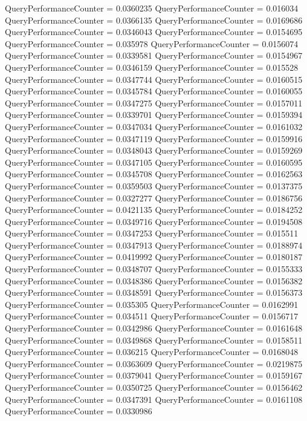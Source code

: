 \documentclass[9pt]{article}
\theoremstyle{plain}
\theoremstyle{definition}
\theoremstyle{remark}
\numberwithin{equation}{section}
\begin{document}
QueryPerformanceCounter  =  0.0360235
QueryPerformanceCounter  =  0.016034
QueryPerformanceCounter  =  0.0366135
QueryPerformanceCounter  =  0.0169686
QueryPerformanceCounter  =  0.0346043
QueryPerformanceCounter  =  0.0154695
QueryPerformanceCounter  =  0.035978
QueryPerformanceCounter  =  0.0156074
QueryPerformanceCounter  =  0.0339581
QueryPerformanceCounter  =  0.0154967
QueryPerformanceCounter  =  0.0346159
QueryPerformanceCounter  =  0.015528
QueryPerformanceCounter  =  0.0347744
QueryPerformanceCounter  =  0.0160515
QueryPerformanceCounter  =  0.0345784
QueryPerformanceCounter  =  0.0160055
QueryPerformanceCounter  =  0.0347275
QueryPerformanceCounter  =  0.0157011
QueryPerformanceCounter  =  0.0339701
QueryPerformanceCounter  =  0.0159394
QueryPerformanceCounter  =  0.0347034
QueryPerformanceCounter  =  0.0161032
QueryPerformanceCounter  =  0.0347119
QueryPerformanceCounter  =  0.0159916
QueryPerformanceCounter  =  0.0348043
QueryPerformanceCounter  =  0.0159269
QueryPerformanceCounter  =  0.0347105
QueryPerformanceCounter  =  0.0160595
QueryPerformanceCounter  =  0.0345708
QueryPerformanceCounter  =  0.0162563
QueryPerformanceCounter  =  0.0359503
QueryPerformanceCounter  =  0.0137375
QueryPerformanceCounter  =  0.0327277
QueryPerformanceCounter  =  0.0186756
QueryPerformanceCounter  =  0.0421135
QueryPerformanceCounter  =  0.0184252
QueryPerformanceCounter  =  0.0349716
QueryPerformanceCounter  =  0.0194508
QueryPerformanceCounter  =  0.0347253
QueryPerformanceCounter  =  0.015511
QueryPerformanceCounter  =  0.0347913
QueryPerformanceCounter  =  0.0188974
QueryPerformanceCounter  =  0.0419992
QueryPerformanceCounter  =  0.0180187
QueryPerformanceCounter  =  0.0348707
QueryPerformanceCounter  =  0.0155333
QueryPerformanceCounter  =  0.0348386
QueryPerformanceCounter  =  0.0156382
QueryPerformanceCounter  =  0.0348591
QueryPerformanceCounter  =  0.0156373
QueryPerformanceCounter  =  0.035305
QueryPerformanceCounter  =  0.0162991
QueryPerformanceCounter  =  0.034511
QueryPerformanceCounter  =  0.0156717
QueryPerformanceCounter  =  0.0342986
QueryPerformanceCounter  =  0.0161648
QueryPerformanceCounter  =  0.0349868
QueryPerformanceCounter  =  0.0158511
QueryPerformanceCounter  =  0.036215
QueryPerformanceCounter  =  0.0168048
QueryPerformanceCounter  =  0.0363609
QueryPerformanceCounter  =  0.0219875
QueryPerformanceCounter  =  0.0379041
QueryPerformanceCounter  =  0.0159167
QueryPerformanceCounter  =  0.0350725
QueryPerformanceCounter  =  0.0156462
QueryPerformanceCounter  =  0.0347391
QueryPerformanceCounter  =  0.0161108
QueryPerformanceCounter  =  0.0330986
\end{document}
